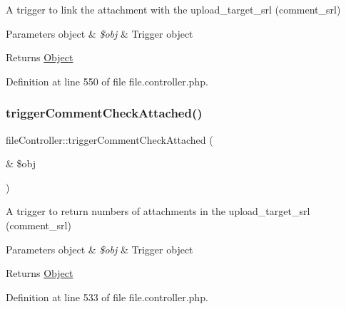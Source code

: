 A trigger to link the attachment with the upload\+\_\+target\+\_\+srl (comment\+\_\+srl)


\begin{DoxyParams}[1]{Parameters}
object & {\em \$obj} & Trigger object \\
\hline
\end{DoxyParams}
\begin{DoxyReturn}{Returns}
\hyperlink{classObject}{Object} 
\end{DoxyReturn}


Definition at line 550 of file file.\+controller.\+php.

\mbox{\label{classfileController_a6076133ce2b8d0c025c54547fbc9cc37}} 
\subsubsection{\texorpdfstring{trigger\+Comment\+Check\+Attached()}{triggerCommentCheckAttached()}}
{\footnotesize\ttfamily file\+Controller\+::trigger\+Comment\+Check\+Attached (\begin{DoxyParamCaption}\item[{\&}]{\$obj }\end{DoxyParamCaption})}

A trigger to return numbers of attachments in the upload\+\_\+target\+\_\+srl (comment\+\_\+srl)


\begin{DoxyParams}[1]{Parameters}
object & {\em \$obj} & Trigger object \\
\hline
\end{DoxyParams}
\begin{DoxyReturn}{Returns}
\hyperlink{classObject}{Object} 
\end{DoxyReturn}


Definition at line 533 of file file.\+controller.\+php.

\mbox{\label{classfileController_ae1011288af2b3a2aca5bc4db41b9ad09}} 
